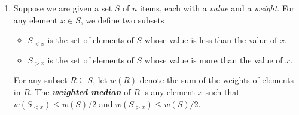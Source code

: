 \begin{exercises}
\begin{enumerate}[label=\arabic*.,ref=\thechapter.\arabic*,leftmargin=*,align=left,itemsep=1.5ex plus 0.5ex,resume]
\item Suppose we are given a set $S$ of $n$ items, each with a \emph{value} and a \emph{weight}. For any element $x \in S$, we define two subsets
\begin{itemize}
\item $S_{<x}$ is the set of elements of $S$ whose value is less than the value of $x$.
\item $S_{>x}$ is the set of elements of $S$ whose value is more than the value of $x$.
\end{itemize}
For any subset $R \subseteq S$, let $w(R)$ denote the sum of the weights of elements in $R$. The \textbf{\textit{weighted median}} of $R$ is any element $x$ such that $w(S_{<x}) \le w(S)/2$ and $w(S_{>x}) \le w(S)/2$.


\end{enumerate}
\end{exercises}
